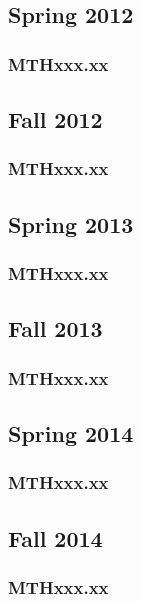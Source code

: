 \documentclass[ openright,titlepage,numbers=noenddot,headinclude,%
                footinclude=true,cleardoublepage=empty,abstractoff, 
                BCOR=5mm,paper=letter,fontsize=11pt,%
                ngerman, american, %
                ]{scrreprt}
\begin{document}
\subsection{Spring 2012}
\subsubsection{MTHxxx.xx}




\subsection{Fall 2012}
\subsubsection{MTHxxx.xx}



\subsection{Spring 2013}
\subsubsection{MTHxxx.xx}




\subsection{Fall 2013}
\subsubsection{MTHxxx.xx}



\subsection{Spring 2014}
\subsubsection{MTHxxx.xx}



\subsection{Fall 2014}
\subsubsection{MTHxxx.xx}

\end{document}
